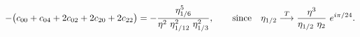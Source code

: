 \begin{equation}
-\big(c_{00} +c_{04} +2c_{02} + 2c_{20} +2c_{22}\big) =
   -{\eta_{1/6}^5 \over \eta^2~ \eta_{1/12}^2 ~\eta_{1/3}^2}, \qquad
   {\rm since} \quad \eta_{1/2} \stackrel{T}{\longrightarrow}
{\eta^3 \over \eta_{1/2} ~\eta_{2} } ~e^{i\pi /24}. 
\end{equation}

